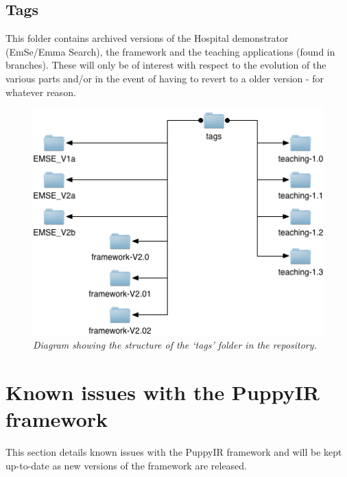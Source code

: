 \documentclass[letterpaper,10pt,english]{sphinxmanual}
\begin{document}
\subsection{Tags}
\label{repo:tags}
This folder contains archived versions of the Hospital demonstrator (EmSe/Emma Search), the framework and the teaching applications (found in branches). These will only be of interest with respect to the evolution of the various parts and/or in the event of having to revert to a older version - for whatever reason.
\begin{figure}[htbp]
\centering
\capstart

\includegraphics{tag.png}
\caption{\emph{Diagram showing the structure of the `tags' folder in the repository.}}\end{figure}


\section{Known issues with the PuppyIR framework}
\label{issues:known-issues-with-the-puppyir-framework}\label{issues::doc}\label{issues:issues}
This section details known issues with the PuppyIR framework and will be kept up-to-date as new versions of the framework are released.
\end{document}
